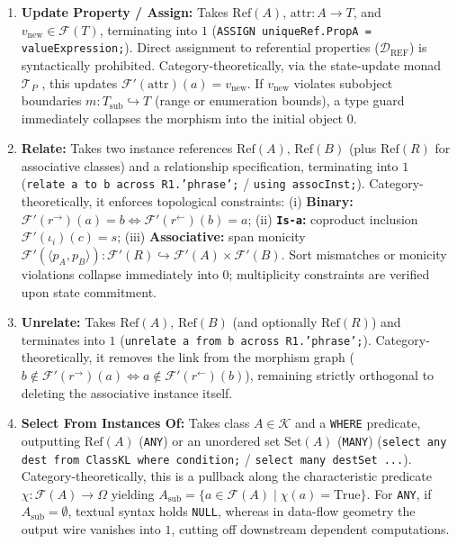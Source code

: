 \documentclass[11pt,a4paper]{article}
\theoremstyle{definition}
\theoremstyle{plain}
\theoremstyle{remark}
\newcommand{\Dref}{\mathcal{D}_{\mathrm{REF}}}
\begin{document}
\begin{enumerate}[label=\textbf{(\arabic*)}, leftmargin=*]
    \item \textbf{Update Property / Assign:}
    Takes $\mathrm{Ref}(A)$, $\mathrm{attr} : A \to T$, and $v_{\mathrm{new}} \in \mathcal{F}(T)$, terminating into $1$ (\texttt{ASSIGN uniqueRef.PropA = valueExpression;}). Direct assignment to referential properties ($\Dref$) is syntactically prohibited.
    Category-theoretically, via the state-update monad $\mathcal{T}_P$ \cite{moggi1991}, this updates $\mathcal{F}'(\mathrm{attr})(a) = v_{\mathrm{new}}$. If $v_{\mathrm{new}}$ violates subobject boundaries $m : T_{\mathrm{sub}} \hookrightarrow T$ (range or enumeration bounds), a type guard immediately collapses the morphism into the initial object $0$.
    \item \textbf{Relate:}
    Takes two instance references $\mathrm{Ref}(A),\, \mathrm{Ref}(B)$ (plus $\mathrm{Ref}(R)$ for associative classes) and a relationship specification, terminating into $1$ (\texttt{relate a to b across R1.'phrase';} / \texttt{using assocInst;}).
    Category-theoretically, it enforces topological constraints: (i) \textbf{Binary:} $\mathcal{F}'(r^{\rightarrow})(a) = b \iff \mathcal{F}'(r^{\leftarrow})(b) = a$; (ii) \textbf{\texttt{Is-a}:} coproduct inclusion $\mathcal{F}'(\iota_i)(c) = s$; (iii) \textbf{Associative:} span monicity $\mathcal{F}'(\langle p_A, p_B \rangle) : \mathcal{F}'(R) \hookrightarrow \mathcal{F}'(A) \times \mathcal{F}'(B)$. Sort mismatches or monicity violations collapse immediately into $0$; multiplicity constraints are verified upon state commitment.

    \item \textbf{Unrelate:}
    Takes $\mathrm{Ref}(A),\, \mathrm{Ref}(B)$ (and optionally $\mathrm{Ref}(R)$) and terminates into $1$ (\texttt{unrelate a from b across R1.'phrase';}).
    Category-theoretically, it removes the link from the morphism graph ($b \notin \mathcal{F}'(r^{\rightarrow})(a) \iff a \notin \mathcal{F}'(r^{\leftarrow})(b)$), remaining strictly orthogonal to deleting the associative instance itself.

    \item \textbf{Select From Instances Of:}
    Takes class $A \in \mathcal{K}$ and a \texttt{WHERE} predicate, outputting $\mathrm{Ref}(A)$ (\texttt{ANY}) or an unordered set $\mathrm{Set}(A)$ (\texttt{MANY}) (\texttt{select any dest from ClassKL where condition;} / \texttt{select many destSet ...}).
    Category-theoretically, this is a pullback along the characteristic predicate $\chi : \mathcal{F}(A) \to \Omega$ yielding $A_{\mathrm{sub}} = \{a \in \mathcal{F}(A) \mid \chi(a) = \mathrm{True}\}$. For \texttt{ANY}, if $A_{\mathrm{sub}} = \emptyset$, textual syntax holds \texttt{NULL}, whereas in data-flow geometry the output wire vanishes into $1$, cutting off downstream dependent computations.


\end{enumerate}
\end{document}
